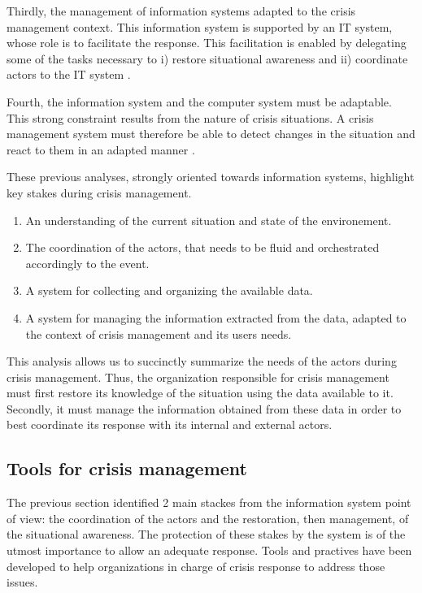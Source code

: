 Thirdly, the management of information systems adapted to the crisis management context.
This information system is supported by an IT system, whose role is to facilitate the response.
This facilitation is enabled by delegating some of the tasks necessary to i) restore situational awareness and ii) coordinate actors to the IT system \cite{benabenManagementCollaborativeBehavior2015}.

Fourth, the information system and the computer system must be adaptable.
This strong constraint results from the nature of crisis situations.
A crisis management system must therefore be able to detect changes in the situation and react to them in an adapted manner \cite{barthe-delanoeEventdrivenAgilityInteroperability2014,charlesModelDefineAssess2010}.

These previous analyses, strongly oriented towards information systems, highlight key stakes during crisis management.

\begin{enumerate}
    \item An understanding of the current situation and state of the environement.
    \item The coordination of the actors, that needs to be fluid and orchestrated accordingly to the event.
    \item A system for collecting and organizing the available data.
    \item A system for managing the information extracted from the data, adapted to the context of crisis management and its users needs.
\end{enumerate}

This analysis allows us to succinctly summarize the needs of the actors during crisis management.
Thus, the organization responsible for crisis management must first restore its knowledge of the situation using the data available to it.
Secondly, it must manage the information obtained from these data in order to best coordinate its response with its internal and external actors.

\subsection{Tools for crisis management}
The previous section identified 2 main stackes from the information system point of view: the coordination of the actors and the restoration, then management, of the situational awareness.
The protection of these stakes by the system is of the utmost importance to allow an adequate response.
Tools and practives have been developed to help organizations in charge of crisis response to address those issues.

